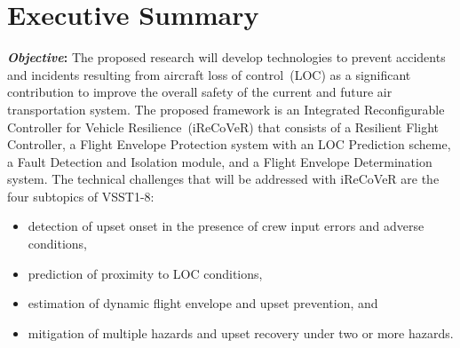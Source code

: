 \documentclass[letter,onecolumn,12pt]{aiaa-tc}
\begin{document}
%
%
%


\section*{Executive Summary}

\textbf{\emph{Objective}:} The proposed research will develop technologies to prevent accidents and incidents resulting from aircraft loss of control~(LOC) as a significant contribution to improve the overall safety of the current and future air transportation system. The proposed framework is an Integrated Reconfigurable Controller for Vehicle Resilience~(iReCoVeR) that consists of a Resilient Flight Controller, a Flight Envelope Protection system with an LOC Prediction scheme, a Fault Detection and Isolation module, and a Flight Envelope Determination system. The technical challenges that will be addressed with iReCoVeR are the four subtopics of VSST1-8:
\begin{itemize}
\setlength{\itemsep}{-4pt}
\vspace{-2mm}
    \item detection of upset onset in the presence of crew input errors and adverse conditions,
    \item prediction of proximity to LOC conditions,
    \item estimation of dynamic flight envelope and upset prevention, and
    \item mitigation of multiple hazards and upset recovery under two or more hazards.
\end{itemize}
\end{document}
